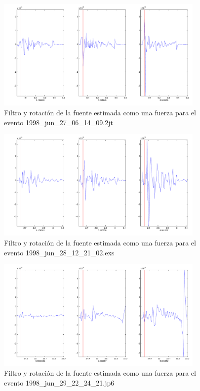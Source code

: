 \begin{figure}[H]
\includegraphics[width=0.9\textwidth,height=0.4\textheight]{linea_timerev/figuras/plotSrcEv10filtrotsrc.pdf}
\caption{Filtro y rotación de la fuente estimada como una fuerza para el
evento 1998\_jun\_27\_06\_14\_09.2jt}
\end{figure}
\begin{figure}[H]
\includegraphics[width=0.9\textwidth,height=0.4\textheight]{linea_timerev/figuras/plotSrcEv11filtrotsrc.pdf}
\caption{Filtro y rotación de la fuente estimada como una fuerza para el
evento 1998\_jun\_28\_12\_21\_02.exs}
\end{figure}
\begin{figure}[H]
\includegraphics[width=0.9\textwidth,height=0.4\textheight]{linea_timerev/figuras/plotSrcEv12filtrotsrc.pdf}
\caption{Filtro y rotación de la fuente estimada como una fuerza para el
evento 1998\_jun\_29\_22\_24\_21.jp6}
\end{figure}
